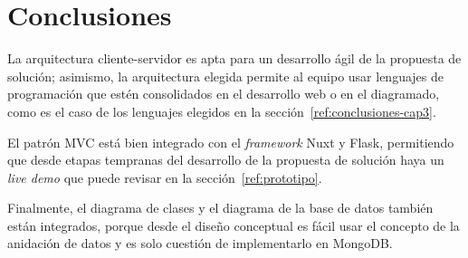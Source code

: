\newpage\section{Conclusiones}

La arquitectura cliente-servidor es apta para un desarrollo ágil de la propuesta de solución; asimismo, la arquitectura elegida permite al equipo usar lenguajes de programación que estén consolidados en el desarrollo web o en el diagramado, como es el caso de los lenguajes elegidos en la sección~\ref{ref:conclusiones-cap3}.


El patrón MVC está bien integrado con el \textit{framework} Nuxt y Flask, permitiendo que desde etapas tempranas del desarrollo de la propuesta de solución haya un \textit{live demo} que puede revisar en la sección~\ref{ref:prototipo}.


Finalmente, el diagrama de clases y el diagrama de la base de datos también están integrados, porque desde el diseño conceptual es fácil usar el concepto de la anidación de datos y es solo cuestión de implementarlo en MongoDB.
